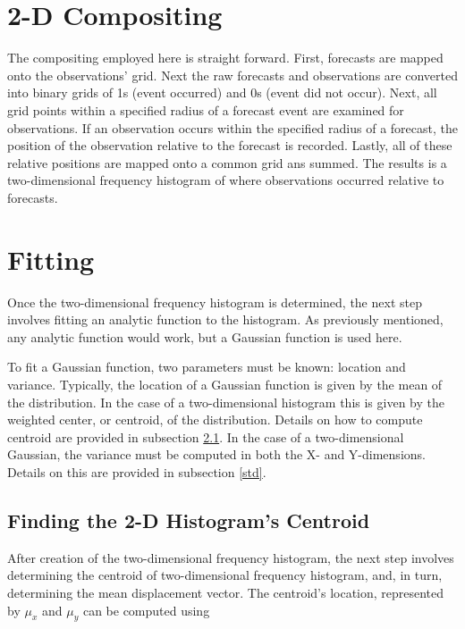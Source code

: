 \section{2-D Compositing}
\label{compositing}

The compositing employed here is straight forward. First, forecasts are mapped onto the observations' grid. Next the raw forecasts and observations are converted into binary grids of 1s (event occurred) and 0s (event did not occur). Next, all grid points within a specified radius of a forecast event are examined for observations. If an observation occurs within the specified radius of a forecast, the position of the observation relative to the forecast is recorded. Lastly, all of these relative positions are mapped onto a common grid ans summed. The results is a two-dimensional frequency histogram of where observations occurred relative to forecasts.




\section{Fitting}
\label{fitting}

Once the two-dimensional frequency histogram is determined, the next step involves fitting an analytic function to the histogram. As previously mentioned, any analytic function would work, but a Gaussian function is used here.

To fit a Gaussian function, two parameters must be known: location and variance. Typically, the location of a Gaussian function is given by the mean of the distribution. In the case of a two-dimensional histogram this is given by the weighted center, or centroid, of the distribution. Details on how to compute centroid are provided in subsection \ref{centroid}. In the case of a two-dimensional Gaussian, the variance must be computed in both the X- and Y-dimensions. Details on this are provided in subsection \ref{std}.




\subsection{Finding the 2-D Histogram's Centroid}
\label{centroid}

After creation of the two-dimensional frequency histogram, the next step involves determining the centroid of two-dimensional frequency histogram, and, in turn, determining the mean displacement vector. The centroid's location, represented by $\mu_x$ and $\mu_y$ can be computed using

